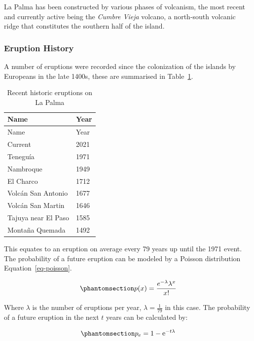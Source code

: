 \documentclass[
]{agujournal2019}
\begin{document}
La Palma has been constructed by various phases of volcanism, the most
recent and currently active being the \emph{Cumbre Vieja} volcano, a
north-south volcanic ridge that constitutes the southern half of the
island.

\subsubsection{Eruption History}\label{eruption-history}

A number of eruptions were recorded since the colonization of the
islands by Europeans in the late 1400s, these are summarised in
Table~\ref{tbl-history}.

\begin{longtable}[]{@{}ll@{}}
\caption{Recent historic eruptions on La
Palma}\label{tbl-history}\tabularnewline
\toprule\noalign{}
Name & Year \\
\midrule\noalign{}
\endfirsthead
\toprule\noalign{}
Name & Year \\
\midrule\noalign{}
\endhead
\bottomrule\noalign{}
\endlastfoot
Current & 2021 \\
Teneguía & 1971 \\
Nambroque & 1949 \\
El Charco & 1712 \\
Volcán San Antonio & 1677 \\
Volcán San Martin & 1646 \\
Tajuya near El Paso & 1585 \\
Montaña Quemada & 1492 \\
\end{longtable}

This equates to an eruption on average every 79 years up until the 1971
event. The probability of a future eruption can be modeled by a Poisson
distribution Equation~\ref{eq-poisson}.

\begin{equation}\phantomsection\label{eq-poisson}{
p(x)=\frac{e^{-\lambda} \lambda^{x}}{x !}
}\end{equation}

Where \(\lambda\) is the number of eruptions per year,
\(\lambda=\frac{1}{79}\) in this case. The probability of a future
eruption in the next \(t\) years can be calculated by:

\begin{equation}\phantomsection\label{eq-probability}{
p_e = 1-\mathrm{e}^{-t \lambda}
}\end{equation}
\end{document}
